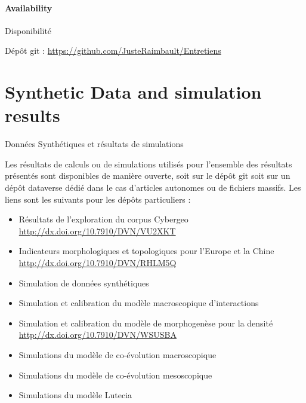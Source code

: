 % 

\paragraph{Availability}{Disponibilité}

Dépôt git : \url{https://github.com/JusteRaimbault/Entretiens}








\section{Synthetic Data and simulation results}{Données Synthétiques et résultats de simulations}

Les résultats de calculs ou de simulations utilisés pour l'ensemble des résultats présentés sont disponibles de manière ouverte, soit sur le dépôt git soit sur un dépôt dataverse dédié dans le cas d'articles autonomes ou de fichiers massifs. Les liens sont les suivants pour les dépôts particuliers :

\begin{itemize}
	\item Résultats de l'exploration du corpus Cybergeo \url{http://dx.doi.org/10.7910/DVN/VU2XKT}
	\item Indicateurs morphologiques et topologiques pour l'Europe et la Chine \url{http://dx.doi.org/10.7910/DVN/RHLM5Q}
	\item Simulation de données synthétiques 
	\item Simulation et calibration du modèle macroscopique d'interactions
	\item Simulation et calibration du modèle de morphogenèse pour la densité \url{http://dx.doi.org/10.7910/DVN/WSUSBA}
	\item Simulations du modèle de co-évolution macroscopique \url{}
	\item Simulations du modèle de co-évolution mesoscopique \url{}
	\item Simulations du modèle Lutecia \url{}
\end{itemize}













